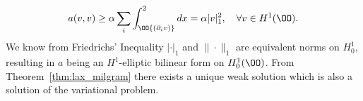 \begin{bev}
    \begin{equation}
        a(v,v) \geq \alpha \sum_i \int_\OO {\left(\partial_i v\right)}^2 dx = \alpha |v|^2_1, \quad \forall v \in H^1(\OO).
        \label{eq:alpha_ellipticity}
    \end{equation}
    We know from Friedrichs' Inequality $|\cdot|_1$ and $\| \cdot \|_1$ are equivalent norms on $H_0^1$,
     resulting in $a$ being an $H^1$-elliptic bilinear form on $H_0^1(\OO)$.
    From Theorem~\ref{thm:lax_milgram} there exists a unique weak solution which is also a solution of the variational problem.
\end{bev}